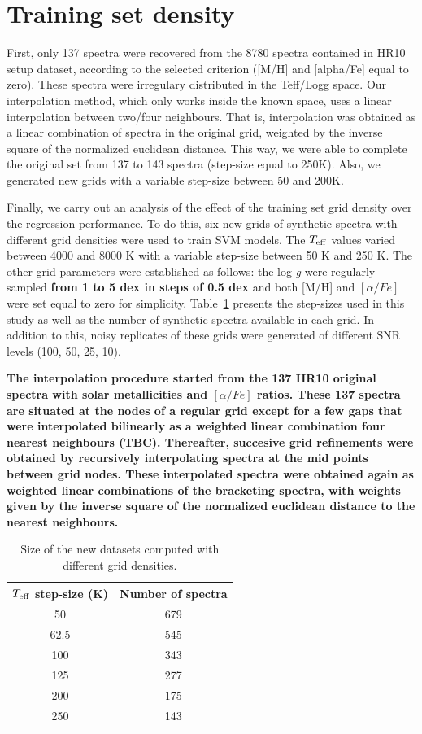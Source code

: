 \documentclass[a4paper,fleqn,usenatbib]{mnras}
\begin{document}
{{{%
\section{Training set density}
\label{sec:comparison3}

First, only 137 spectra were recovered from the 8780 spectra contained in HR10 setup dataset, according to the selected criterion ([M/H] and [alpha/Fe] equal to zero). These spectra were irregulary distributed in the Teff/Logg space. Our interpolation method, which only works inside the known space, uses a linear interpolation between two/four neighbours. That is, interpolation was obtained as a linear combination of spectra in the original grid, weighted by the inverse square of the normalized euclidean distance. This way, we were able to complete the original set from 137 to 143 spectra (step-size equal to 250K). Also, we generated new grids with a variable step-size between 50 and 200K.

Finally, we carry out an analysis of the effect of the training set
grid density over the regression performance.  To do this, six new
grids of synthetic spectra with different grid densities were used to
train SVM models. The $T_{\rm eff}$ values varied between 4000 and
8000 K with a variable step-size between 50 K and 250 K. The other
grid parameters were established as follows: the log \textit{g} were
regularly sampled {\bf from 1 to 5 dex in steps of 0.5 dex} and both [M/H] and $\left[
  \alpha/Fe \right]$ were set equal to zero for
simplicity. Table~\ref{tab:grid} presents the step-sizes used in this
study as well as the number of synthetic spectra available in each
grid.  In addition to this, noisy replicates of these grids were
generated of different SNR levels (100, 50, 25, 10).

{\bf The interpolation procedure started from the 137 HR10 original spectra with solar metallicities and  $\left[
\alpha/Fe \right]$ ratios. These 137 spectra are situated at the nodes of a regular grid except for a few gaps that were interpolated bilinearly as a weighted linear combination four nearest neighbours (TBC). Thereafter, succesive grid refinements were obtained by recursively interpolating spectra at the mid points between grid nodes. These interpolated spectra were obtained again as weighted linear combinations of the bracketing spectra, with weights given by the inverse square of the normalized euclidean distance to the nearest neighbours.}

\begin{table}
\centering
\caption{Size of the new datasets computed with different grid densities.}
\label{tab:grid}
\begin{tabular}{c c}
\hline
\textbf{$T_{\rm eff}$ step-size (K)} & \textbf{Number of spectra} \\
\hline
50 & 679 \\
62.5 & 545 \\
100 & 343 \\
125 & 277 \\
200 & 175\\
250 & 143\\
\hline
\end{tabular}
\end{table}

}}}
\end{document}
